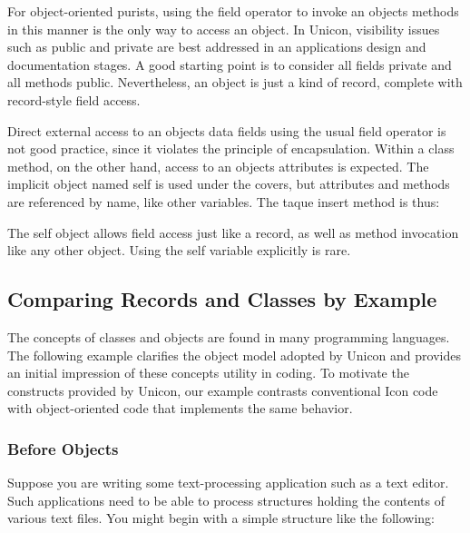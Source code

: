 For object-oriented purists, using the field operator to invoke an
object{\textquotesingle}s methods in this manner is the only way to
access an object. In Unicon, visibility issues such as
{\textquotedbl}public{\textquotedbl} and
{\textquotedbl}private{\textquotedbl} are best addressed in an
application{\textquotesingle}s design and documentation stages. A good
starting point is to consider all fields
{\textquotedbl}private{\textquotedbl} and all methods
{\textquotedbl}public{\textquotedbl}. Nevertheless, an object is just a
kind of record, complete with record-style field access.

Direct external access to an object{\textquotesingle}s data fields using
the usual field operator is not good practice, since it violates the
principle of encapsulation. Within a class method, on the other hand,
access to an object{\textquotesingle}s attributes is expected. The
implicit object named \textsf{self} is used under the covers, but
attributes and methods are referenced by name, like other variables.
The taque insert method is thus: 


The \textsf{self} object allows field access just like a record, as well
as method invocation like any other object. Using the \textsf{self}
variable explicitly is rare.

\subsection{Comparing Records and Classes by Example}

The concepts of classes and objects are found in many programming
languages. The following example clarifies the object model adopted by
Unicon and provides an initial impression of these
concepts{\textquotesingle} utility in coding. To motivate the
constructs provided by Unicon, our example contrasts conventional Icon
code with object-oriented code that implements the same behavior.

\subsubsection{Before Objects}

Suppose you are writing some text-processing application such as a text
editor. Such applications need to be able to process
structures holding the contents of various text files. You might begin
with a simple structure like the following: 

